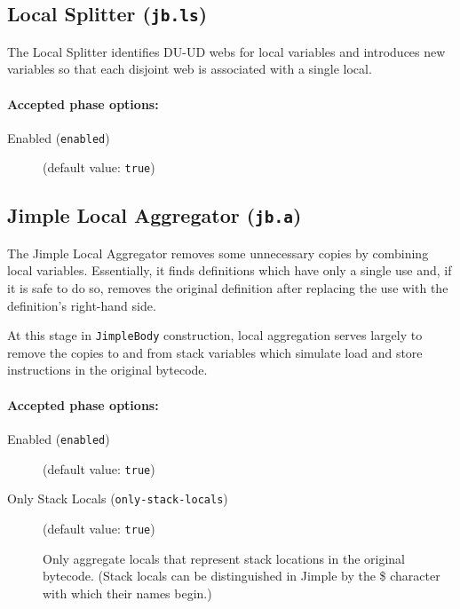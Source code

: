 \documentclass{article}
\begin{document}
\subsection{Local Splitter ({\tt jb.ls})}

The Local Splitter identifies DU-UD webs for local variables and
introduces new variables so that each disjoint web is associated
with a single local.


\paragraph{Accepted phase options:} 

\begin{description}

\item[Enabled ({\tt enabled})]
(default value: {\tt true})






\end{description}

\subsection{Jimple Local Aggregator ({\tt jb.a})}


\par

The Jimple Local Aggregator removes some unnecessary copies by
combining local variables. Essentially, it finds definitions
which have only a single use and, if it is safe to do so, removes
the original definition after replacing the use with the
definition's right-hand side.

\par

At this stage in {\tt JimpleBody} construction, local
aggregation serves largely to remove the copies to and from stack
variables which simulate load and store instructions in the
original bytecode.


\paragraph{Accepted phase options:} 

\begin{description}

\item[Enabled ({\tt enabled})]
(default value: {\tt true})






\item[Only Stack Locals ({\tt only-stack-locals})]
(default value: {\tt true})




Only aggregate locals that represent stack locations in the
original bytecode.  (Stack locals can be distinguished in Jimple
by the \$ character with which their names begin.)



\end{description}
\end{document}
